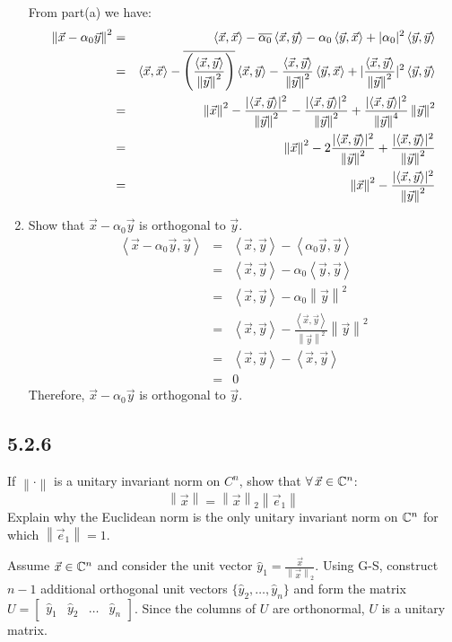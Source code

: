 \documentclass[letterpaper,12pt,fleqn]{article}
\newcommand{\inner}[2]{\left<#1,#2\right>}
\newcommand{\norm}[1]{\left\lVert#1\right\rVert}
\newcommand{\vx}{\vec{x}}
\newcommand{\vy}{\vec{y}}
\newcommand{\hy}{\hat{y}}
\newcommand{\ve}{\vec{e}}
\renewcommand{\a}{\alpha}
\newcommand{\conj}[1]{\overline{#1}}
\newcommand{\nc}{\norm{\cdot}}
\begin{document}
\begin{enumerate}[label={\alph*)}]
  From part(a) we have:
  \begin{eqnarray*}
    \norm{\vx-\a_0\vy}^2 &=&
    \inner{\vx}{\vx}-\conj{\a_0}\inner{\vx}{\vy}-\a_0\inner{\vy}{\vx}+
    \abs{\a_0}^2\inner{\vy}{\vy} \\
    &=&
    \inner{\vx}{\vx}-\conj{\left(\frac{\inner{\vx}{\vy}}{\norm{\vy}^2}\right)}
    \inner{\vx}{\vy}-\frac{\inner{\vx}{\vy}}{\norm{\vy}^2}\inner{\vy}{\vx}+
    \abs{\frac{\inner{\vx}{\vy}}{\norm{\vy}^2}}^2\inner{\vy}{\vy} \\
    &=&
    \norm{\vx}^2-\frac{\abs{\inner{\vx}{\vy}}^2}{\norm{\vy}^2}
    -\frac{\abs{\inner{\vx}{\vy}}^2}{\norm{\vy}^2}+
    \frac{\abs{\inner{\vx}{\vy}}^2}{\norm{\vy}^4}\norm{\vy}^2 \\
    &=& 
    \norm{\vx}^2-2\frac{\abs{\inner{\vx}{\vy}}^2}{\norm{\vy}^2} +
    \frac{\abs{\inner{\vx}{\vy}}^2}{\norm{\vy}^2} \\
    &=& \norm{\vx}^2-\frac{\abs{\inner{\vx}{\vy}}^2}{\norm{\vy}^2}
  \end{eqnarray*}

\item Show that $\vx-\a_0\vy$ is orthogonal to $\vy$.
  \begin{eqnarray*}
    \inner{\vx-\a_0\vy}{\vy} &=& \inner{\vx}{\vy}-\inner{\a_0\vy}{\vy} \\
    &=& \inner{\vx}{\vy}-\a_0\inner{\vy}{\vy} \\
    &=& \inner{\vx}{\vy}-\a_0\norm{\vy}^2 \\
    &=& \inner{\vx}{\vy}-\frac{\inner{\vx}{\vy}}{\norm{\vy}^2}\norm{\vy}^2 \\
    &=& \inner{\vx}{\vy}-\inner{\vx}{\vy} \\
    &=& 0
  \end{eqnarray*}
  Therefore, $\vx-\a_0\vy$ is orthogonal to $\vy$.
\end{enumerate}

\subsection*{5.2.6}

If $\nc$ is a unitary invariant norm on $C^n$, show that $\forall\,\vx\in\C^n$:
\[\norm{\vx}=\norm{\vx}_2\norm{\ve_1}\]
Explain why the Euclidean norm is the only unitary invariant norm on $\mathbb{C}^n$
for which $\norm{\ve_1}=1$.

Assume $\vx\in\C^n$ and consider the unit vector
$\hy_1=\frac{\vx}{\norm{\vx}_2}$. Using G-S, construct $n-1$ additional
orthogonal unit vectors $\{\hy_2,\ldots,\hy_n\}$ and form the matrix
$U=\begin{bmatrix} \hy_1 & \hy_2 & \ldots & \hy_n \end{bmatrix}$.
Since the columns of $U$ are orthonormal, $U$ is a unitary matrix.
\end{document}
